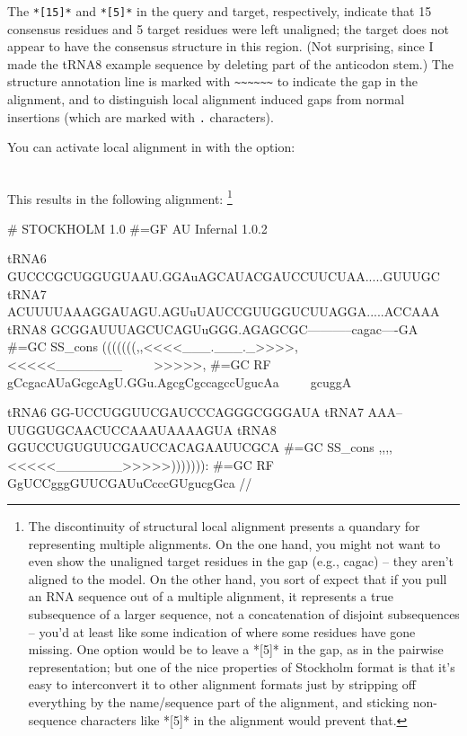 The \verb+*[15]*+ and \verb+*[5]*+ in the query and target,
respectively, indicate that 15 consensus residues and 5 target
residues were left unaligned; the target does not appear to have the
consensus structure in this region. (Not surprising, since I made the
tRNA8 example sequence by deleting part of the anticodon stem.)  The
structure annotation line is marked with \verb+~~~~~~+ to indicate the
gap in the alignment, and to distinguish local alignment induced gaps
from normal insertions (which are marked with \verb+.+ characters).

You can activate local alignment in  with the 
option:

\\

This results in the following alignment:
\footnote{The discontinuity of structural local alignment presents a
quandary for representing multiple alignments. On the one hand, you
might not want to even show the unaligned target residues in the gap
(e.g., cagac) -- they aren't aligned to the model. On the other hand,
you sort of expect that if you pull an RNA sequence out of a multiple
alignment, it represents a true subsequence of a larger sequence, not
a concatenation of disjoint subsequences -- you'd at least like some
indication of where some residues have gone missing. One option would
be to leave a *[5]* in the gap, as in the pairwise
representation; but one of the nice properties of Stockholm format is
that it's easy to interconvert it to other alignment formats just by
stripping off everything by the name/sequence part of the alignment,
and sticking non-sequence characters like *[5]* in the
alignment would prevent that.}

{\samepage
\begin{sreoutput}
# STOCKHOLM 1.0
#=GF AU Infernal 1.0.2

tRNA6        GUCCCGCUGGUGUAAU.GGAuAGCAUACGAUCCUUCUAA.....GUUUGC
tRNA7        ACUUUUAAAGGAUAGU.AGUuUAUCCGUUGGUCUUAGGA.....ACCAAA
tRNA8        GCGGAUUUAGCUCAGUuGGG.AGAGCGC-----------cagac----GA
#=GC SS_cons (((((((,,<<<<___.___._>>>>,<<<<<_______~~~~~>>>>>,
#=GC RF      gCcgacAUaGcgcAgU.GGu.AgcgCgccagccUgucAa~~~~~gcuggA

tRNA6        GG-UCCUGGUUCGAUCCCAGGGCGGGAUA
tRNA7        AAA--UUGGUGCAACUCCAAAUAAAAGUA
tRNA8        GGUCCUGUGUUCGAUCCACAGAAUUCGCA
#=GC SS_cons ,,,,<<<<<_______>>>>>))))))):
#=GC RF      GgUCCgggGUUCGAUuCcccGUgucgGca
//
\end{sreoutput}
}

